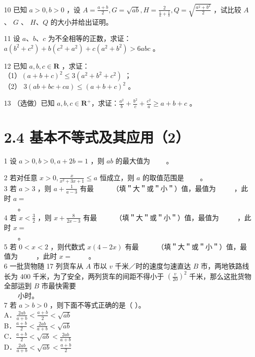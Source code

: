 \documentclass[10pt]{article}
\begin{document}
10 已知 \(a>0, b>0\) ，设 \(A=\frac{a+b}{2}, G=\sqrt{a b}, H=\frac{2}{\frac{1}{a}+\frac{1}{b}}, Q=\sqrt{\frac{a^{2}+b^{2}}{2}}\) ，试比较 \(A\) 、 \(G\) 、 \(H 、 Q\) 的大小并给出证明。

11 设 \(a 、 b 、 c\) 为不全相等的正数，求证：\(a\left(b^{2}+c^{2}\right)+b\left(c^{2}+a^{2}\right)+c\left(a^{2}+b^{2}\right)>6 a b c\) 。

12 已知 \(a, b, c \in \mathbf{R}\) ，求证：\\
（1）\((a+b+c)^{2} \leqslant 3\left(a^{2}+b^{2}+c^{2}\right)\) ；\\
（2） \(3(a b+b c+c a) \leqslant(a+b+c)^{2}\) 。

13 （选做）已知 \(a, b, c \in \mathbf{R}^{+}\)，求证：\(\frac{a^{2}}{b}+\frac{b^{2}}{c}+\frac{c^{2}}{a} \geqslant a+b+c\) 。

\section*{2.4 基本不等式及其应用（2）}
1 设 \(a>0, b>0, a+2 b=1\) ，则 \(a b\) 的最大值为 \(\qquad\)。

2 若对任意 \(x>0, \frac{x}{x^{2}+3 x+1} \leqslant a\) 恒成立，则 \(a\) 的取值范围是 \(\qquad\)。\\
3 若 \(a>3\) ，则 \(a+\frac{1}{a-3}\) 有最 \(\qquad\) （填＂大＂或＂小＂）值，最值为 \(\qquad\) ，此时 \(a=\)\\
\(\qquad\)。\\
4 若 \(x<\frac{3}{2}\) ，则 \(x+\frac{8}{2 x-3}\) 有最 \(\qquad\) （填＂大＂或＂小＂）值，最值为 \(\qquad\) ，此时 \(x=\)\\
\(\qquad\)。\\
5 若 \(0<x<2\) ，则代数式 \(x(4-2 x)\) 有最 \(\qquad\) （填＂大＂或＂小＂）值，最值为 \(\qquad\) ，此时 \(x=\) \(\qquad\)。\\
6 一批货物随 17 列货车从 \(A\) 市以 \(v\) 千米／时的速度匀速直达 \(B\) 市，两地铁路线长为 400 千米，为了安全，两列货车的间距不得小于 \(\left(\frac{v}{20}\right)^{2}\) 千米，那么这批货物全部运到 \(B\) 市最快需要\\
\(\qquad\)小时。\\
7 若 \(a>b>0\) ，则下面不等式正确的是（ ）。\\
A．\(\frac{2 a b}{a+b}<\frac{a+b}{2}<\sqrt{a b}\)\\
B．\(\frac{a+b}{2}<\frac{2 a b}{a+b}<\sqrt{a b}\)\\
C．\(\frac{a+b}{2}<\sqrt{a b}<\frac{2 a b}{a+b}\)\\
D．\(\frac{2 a b}{a+b}<\sqrt{a b}<\frac{a+b}{2}\)
\end{document}
